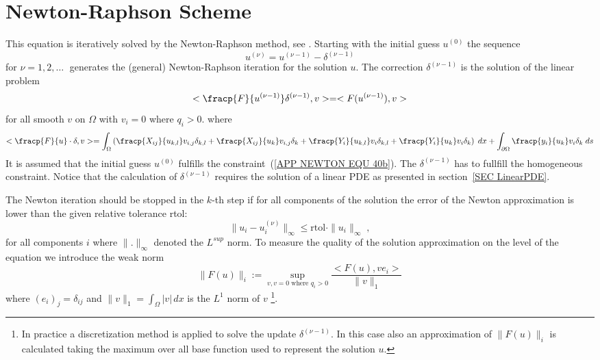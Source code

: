 \section{Newton-Raphson Scheme}
This equation is iteratively solved by the Newton-Raphson method, see \cite{Kelley2004a}.
Starting with the initial guess
$u^{(0)}$ the sequence
\begin{equation} \label{APP NEWTON EQU 43}
  u^{(\nu)}= u^{(\nu-1)} - \delta^{(\nu-1)}
\end{equation}
for $\nu=1,2,\ldots \;$ generates the (general) Newton-Raphson iteration for the
solution $u$. The correction $\delta^{(\nu-1)}$ is the solution of the linear problem
\begin{equation} \label{APP NEWTON EQU 43b0}
< \fracp{F}{u^{(\nu-1)}} \delta^{(\nu-1)} ,v > = <F(u^{(\nu-1)}),v>
\end{equation}
for all smooth $v$ on $\Omega$ with $v_i=0$ where $q_i>0$. 
where
\begin{equation} \label{APP NEWTON EQU 43b}
< \fracp{F}{u} \cdot \delta ,v > = 
\int_{\Omega} \left( \fracp{X_{ij}}{u_{k,l}} v_{i,j}\delta_{k,l} + 
\fracp{X_{ij}}{u_{k}} v_{i,j}\delta_{k} + \fracp{Y_{i}}{u_{k,l}} v_{i}\delta_{k,l} + 
\fracp{Y_{i}}{u_{k}} v_{i}\delta_{k} \right) \; dx 
+ \int_{\partial \Omega} 
\fracp{y_{i}}{u_{k}} v_{i}\delta_{k} \; ds 
\end{equation}
It is assumed that the initial guess $u^{(0)}$ fulfills the constraint~(\ref{APP NEWTON EQU 40b}). 
The $\delta^{(\nu-1)}$ has to fullfill the homogeneous constraint. 
Notice that the calculation of $\delta^{(\nu-1)}$ requires the solution of a linear PDE
as presented in section~\ref{SEC LinearPDE}.

The Newton iteration should be stopped in the $k$-th step if for
all components of the solution the error of the Newton
approximation is lower than the given relative tolerance {rtol}:
\begin{equation}\label{APP NEWTON EQU 61}
    \| u_{i} - u_{i}^{(\nu)} \|_{\infty} \le \mbox{rtol} \cdot \|u_{i} \|_{\infty}  \; ,
\end{equation}
for all components $i$ 
where $\|. \|_{\infty}$ denoted the $L^{sup}$ norm. To measure the quality of the solution approximation
on the level of the equation we introduce the weak norm
\begin{equation}\label{APP NEWTON EQU 62}
  \| F(u) \|_{i} := \sup_{v , v=0 \mbox{ where } q_{i}>0 } \frac{<F(u), ve_{i}>}{\|v\|_1}
\end{equation}
where $(e_{i})_{j}=\delta_{ij}$ and $\|v\|_1=\int_{\Omega} |v| \,dx$ is the $L^1$ norm of $v$
\footnote{In practice a discretization method is applied to solve the update $\delta^{(\nu-1)}$.
In this case also an approximation of $\| F(u) \|_{i}$ is calculated taking the maximum over all
base function used to represent the solution $u$.}.


